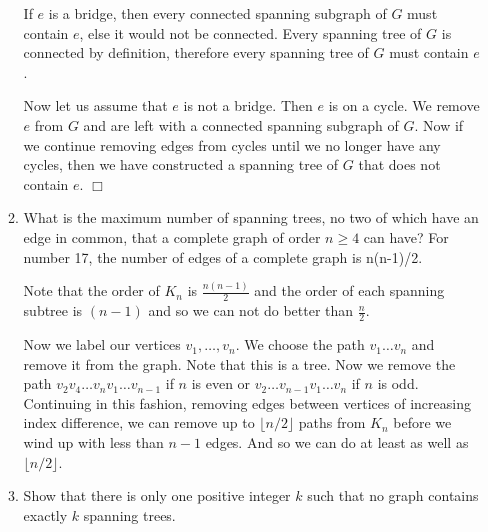 \documentclass[letterpaper]{article}
\begin{document}
\begin{enumerate}
\begin{enumerate}
  If $e$ is a bridge, then every connected spanning subgraph of $G$ must contain $e$, else it would not be connected. Every spanning tree of $G$ is connected by definition, therefore every spanning tree of $G$ must contain $e$.

  Now let us assume that $e$ is not a bridge.
  Then $e$ is on a cycle.
  We remove $e$ from $G$ and are left with a connected spanning subgraph of $G$. Now if we continue removing edges from cycles until we no longer have any cycles, then we have constructed a spanning tree of $G$ that does not contain $e$. $\Box$
  \setcounter{enumii}{16}
  \item
  What is the maximum number of spanning trees, no two of which have an edge in common, that a complete graph of order $n\ge 4$ can have?
  For number 17, the number of edges of a complete graph is n(n-1)/2.

  Note that the order of $K_n$ is $\frac{n(n-1)}{2}$ and the order of each spanning subtree is $(n-1)$ and so we can not do better than $\frac{n}{2}$.

  Now we label our vertices $v_1,\dots,v_n$. We choose the path $v_1\dots v_n$ and remove it from the graph. Note that this is a tree. Now we remove the path $v_2v_4\dots v_nv_1\dots v_{n-1}$ if $n$ is even or $v_2\dots v_{n-1}v_1\dots v_n$ if $n$ is odd. Continuing in this fashion, removing edges between vertices of increasing index difference, we can remove up to $\lfloor n/2\rfloor$ paths from $K_n$ before we wind up with less than $n-1$ edges. And so we can do at least as well as $\lfloor n/2\rfloor$.
  \setcounter{enumii}{18}
  \item
  Show that there is only one positive integer $k$ such that no graph contains exactly $k$ spanning trees.


\end{enumerate}
\end{enumerate}
\end{document}

